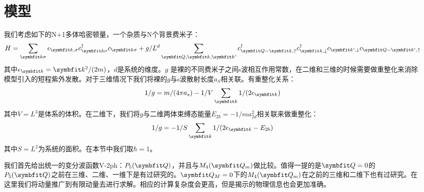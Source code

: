 \section{模型}
我们考虑如下的N+1多体哈密顿量，一个杂质与N个背景费米子：
\begin{equation}
\label{chap3eq:H}
H=\sum_{\Vector{k}\sigma} \epsilon_{\Vector{k},\sigma} c_{\Vector{k} \sigma}^{\dagger} c_{\Vector{k} \sigma}+g/L^d \sum_{\Vector{Q}, \Vector{k}, \Vector{k}^{\prime}} c_{\Vector{Q}-\Vector{k}, \uparrow}^{\dagger} c_{\Vector{k}, \downarrow}^{\dagger} c_{\Vector{k}^{\prime}, \downarrow} c_{\Vector{Q}-\Vector{k}^{\prime}, \uparrow}
\end{equation}
其中$\epsilon_{\Vector{k}}=\Vector{k}^2/(2m)$，$d$是系统的维度。$g$ 是裸的不同费米子之间s波相互作用常数，在二维和三维的时候需要做重整化来消除模型引入的短程紫外发散。对于三维情况下我们将裸的$g$与s波散射长度$a_S$相关联。有重整化关系：
\begin{equation}
1/g=m/(4\pi a_s)-1/V \sum_{\Vector{k}}1/(2\epsilon_{\Vector{k}})
\end{equation}
其中$V=L^3$是体系的体积。在二维下，我们将$g$与二维两体束缚态能量$E_{2b}=-1/ma_{2d}^2$相关联来做重整化：
\begin{equation}
1/g=-1/S \sum_{\Vector{k}}1/(2\epsilon_{\Vector{k}}-E_{2b})
\end{equation}
其中$S=L^2$为系统的面积。在本节中我们取$\hbar=1$。

我们首先给出统一的变分波函数V-2ph：$P_5(\Vector{Q})$，并且与$M_4(\Vector{Q}_m)$做比较。值得一提的是$\Vector{Q}=0$的$P_5(\Vector{Q})$之前在三维、二维、一维下是有过研究的。$\Vector{Q}_M=0$下的$M_4(\Vector{Q}_m)$在之前的三维和二维下也有过研究。在这里我们将动量推广到有限动量去进行求解。相应的计算复杂度会更高，但是揭示的物理信息也会更加准确。

